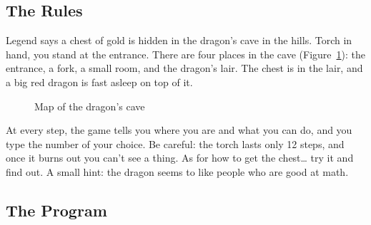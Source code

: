 \subsection{The Rules}

Legend says a chest of gold is hidden in the dragon's cave in the hills. Torch in hand, you stand at the entrance. There are four places in the cave (Figure~\ref{fig:cave-map}): the entrance, a fork, a small room, and the dragon's lair. The chest is in the lair, and a big red dragon is fast asleep on top of it.

\begin{figure}[htbp]
  \centering
  \caption{Map of the dragon's cave}
  \label{fig:cave-map}
\end{figure}

At every step, the game tells you where you are and what you can do, and you type the number of your choice. Be careful: the torch lasts only 12 steps, and once it burns out you can't see a thing. As for how to get the chest\ldots{} try it and find out. A small hint: the dragon seems to like people who are good at math.

\subsection{The Program}

